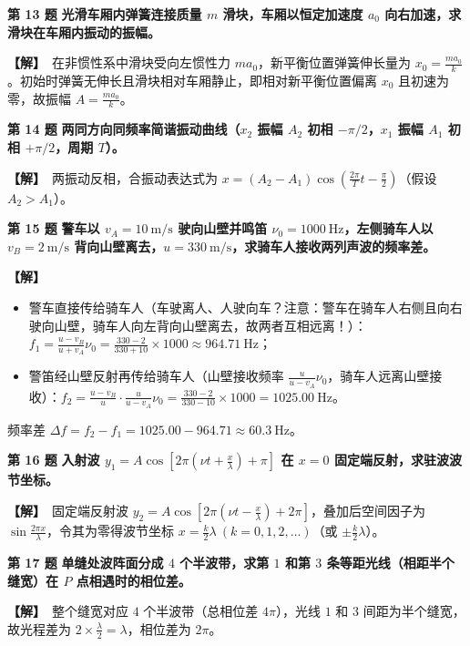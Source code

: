 \documentclass[zihao=5,a4paper,UTF8]{ctexart}
\newenvironment{prob}[2]{%
    \par\vspace{5pt}\noindent\textbf{\color{navy}#1} \textbf{#2}\par\nopagebreak\vspace{2pt}%
}{%
    \par\vspace{3pt}%
}
\newcommand{\sol}{\noindent\textbf{\color{tealaccent}【解】}\ }
\begin{document}
\begin{prob}{第 13 题}{光滑车厢内弹簧连接质量 $m$ 滑块，车厢以恒定加速度 $a_0$ 向右加速，求滑块在车厢内振动的振幅。}
\sol 在非惯性系中滑块受向左惯性力 $ma_0$，新平衡位置弹簧伸长量为 $x_0 = \frac{ma_0}{k}$。初始时弹簧无伸长且滑块相对车厢静止，即相对新平衡位置偏离 $x_0$ 且初速为零，故振幅 $A = \frac{ma_0}{k}$。
\end{prob}

\begin{prob}{第 14 题}{两同方向同频率简谐振动曲线（$x_2$ 振幅 $A_2$ 初相 $-\pi/2$，$x_1$ 振幅 $A_1$ 初相 $+\pi/2$，周期 $T$）。}
\sol 两振动反相，合振动表达式为 $x = (A_2 - A_1)\cos\left(\frac{2\pi}{T}t - \frac{\pi}{2}\right)$（假设 $A_2 > A_1$）。
\end{prob}

\begin{prob}{第 15 题}{警车以 $v_A=10\ \mathrm{m/s}$ 驶向山壁并鸣笛 $\nu_0=1000\ \mathrm{Hz}$，左侧骑车人以 $v_B=2\ \mathrm{m/s}$ 背向山壁离去，$u=330\ \mathrm{m/s}$，求骑车人接收两列声波的频率差。}
\sol
\begin{itemize}[leftmargin=1.5em, itemsep=2pt]
    \item 警车直接传给骑车人（车驶离人、人驶向车？注意：警车在骑车人右侧且向右驶向山壁，骑车人向左背向山壁离去，故两者互相远离！）：$f_1 = \frac{u - v_B}{u + v_A}\nu_0 = \frac{330 - 2}{330 + 10}\times 1000 \approx 964.71\ \mathrm{Hz}$；
    \item 警笛经山壁反射再传给骑车人（山壁接收频率 $\frac{u}{u - v_A}\nu_0$，骑车人远离山壁接收）：$f_2 = \frac{u - v_B}{u}\cdot\frac{u}{u - v_A}\nu_0 = \frac{330 - 2}{330 - 10}\times 1000 = 1025.00\ \mathrm{Hz}$。
\end{itemize}
频率差 $\Delta f = f_2 - f_1 = 1025.00 - 964.71 \approx 60.3\ \mathrm{Hz}$。
\end{prob}

\begin{prob}{第 16 题}{入射波 $y_1 = A\cos\left[2\pi\left(\nu t + \frac{x}{\lambda}\right) + \pi\right]$ 在 $x=0$ 固定端反射，求驻波波节坐标。}
\sol 固定端反射波 $y_2 = A\cos\left[2\pi\left(\nu t - \frac{x}{\lambda}\right) + 2\pi\right]$，叠加后空间因子为 $\sin\frac{2\pi x}{\lambda}$，令其为零得波节坐标 $x = \frac{k}{2}\lambda\ (k=0,1,2,\dots)$（或 $\pm\frac{k}{2}\lambda$）。
\end{prob}

\begin{prob}{第 17 题}{单缝处波阵面分成 $4$ 个半波带，求第 $1$ 和第 $3$ 条等距光线（相距半个缝宽）在 $P$ 点相遇时的相位差。}
\sol 整个缝宽对应 $4$ 个半波带（总相位差 $4\pi$），光线 $1$ 和 $3$ 间距为半个缝宽，故光程差为 $2\times\frac{\lambda}{2} = \lambda$，相位差为 $2\pi$。
\end{prob}
\end{document}
